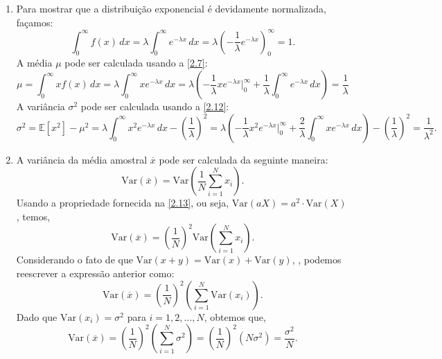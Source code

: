 \begin{enumerate}[label=\textbf{2.\arabic*.}]
	\item Para mostrar que a distribuição exponencial é devidamente normalizada, façamos:
	\begin{equation*}
	\int_0^{\infty} f(x)\, dx = \lambda \int_0^{\infty} e^{-\lambda x}\,dx = \lambda \left(-\dfrac{1}{\lambda}e^{-\lambda x}\right)_0^{\infty} = 1.
	\end{equation*}
	A média $\mu$ pode ser calculada usando a \autoref{2.7}:
	\begin{equation*}
		\mu = \int_{0}^{\infty} x f(x)\, dx = \lambda \int_{0}^{\infty} x e^{-\lambda x}\,dx = \lambda\left(-\dfrac{1}{\lambda}xe^{-\lambda x}\bigg|_{0}^{\infty} + \dfrac{1}{\lambda}\int_{0}^{\infty}e^{-\lambda x}\,dx\right) = \dfrac{1}{\lambda}
	\end{equation*}
	A variância $\sigma^2$ pode ser calculada usando a \autoref{2.12}:
	\begin{equation*}
	\sigma^2 = \mathbb{E}[x^2] - \mu^2 = \lambda\int_{0}^{\infty} x^2 e^{-\lambda x}\, dx - \left(\dfrac{1}{\lambda}\right)^2 = \lambda\left(-\dfrac{1}{\lambda}x^2e^{-\lambda x}\bigg|_{0}^{\infty} + \dfrac{2}{\lambda} \int_{0}^{\infty} xe^{-\lambda x}\,dx\right) - \left(\dfrac{1}{\lambda}\right)^2 = \dfrac{1}{\lambda^2}.
	\end{equation*}
	
	\item A variância da média amostral $\overline{x}$ pode ser calculada da seguinte maneira:
	\begin{equation*}
	\text{Var}(\overline{x}) = \text{Var}\left(\dfrac{1}{N} \sum_{i=1}^{N} x_i\right).
	\end{equation*}
	Usando a propriedade fornecida na \autoref{2.13}, ou seja, $\text{Var}(aX) = a^2 \cdot \text{Var}(X)$, temos,
	\begin{equation*}
		\text{Var}(\overline{x}) = \left(\dfrac{1}{N}\right)^2\text{Var}\left(\sum_{i=1}^{N} x_i\right).
	\end{equation*}
	Considerando o fato de que $\text{Var}(x + y) = \text{Var}(x) +  \text{Var}(y)$, , podemos reescrever a expressão anterior como:
	\begin{equation*}
		\text{Var}(\overline{x}) = \left(\dfrac{1}{N}\right)^2\left(\sum_{i=1}^{N} \text{Var}(x_i)\right).
	\end{equation*}
	Dado que $\text{Var}(x_i) = \sigma^2$ para $i = 1,2,\ldots,N$, obtemos que,
	\begin{equation*}
		\text{Var}(\overline{x}) = \left(\dfrac{1}{N}\right)^2\left(\sum_{i=1}^{N} \sigma^2\right) = \left(\dfrac{1}{N}\right)^2 \left(N\sigma^2\right) = \dfrac{\sigma^2}{N}.
	\end{equation*}
	

\end{enumerate}
